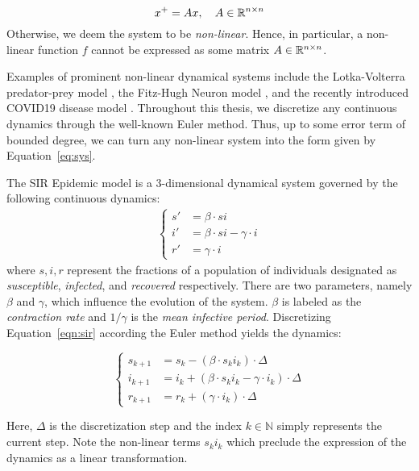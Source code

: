 $$
x^{+} = Ax, \quad A \in {\mathbb{R}}^{n \times n}
$$
%
Otherwise, we deem the system to be \emph{non-linear}.
%
Hence, in particular, a non-linear function $f$ cannot be expressed as some matrix $A \in {\mathbb{R}}^{n \times n}$.

Examples of prominent non-linear dynamical systems include the Lotka-Volterra predator-prey model \cite{wangersky1978lotka}, the Fitz-Hugh Neuron model \cite{fitzhugh1961impulses}, and the recently introduced COVID19 disease model \cite{indiansuper2020supermodel}. Throughout this thesis, we discretize any continuous dynamics through the well-known Euler method. Thus, up to some error term of bounded degree, we can turn any non-linear system into the form given by Equation~\ref{eq:sys}.
%
\begin{example}
\label{ex:sir}
The SIR Epidemic model is a 3-dimensional dynamical system governed by the following continuous dynamics:
\begin{align} \label{eqn:sir}
    \begin{cases}
        s' &= \beta \cdot s i \\
        i' &= \beta \cdot s i - \gamma \cdot i \\
        r' &= \gamma \cdot i
    \end{cases}
\end{align}
where $s,i,r$ represent the fractions of a population of individuals designated as \textit{susceptible}, \textit{infected}, and \textit{recovered} respectively. There are two parameters, namely $\beta$ and $\gamma$, which influence the evolution of the system. $\beta$ is labeled as the \emph{contraction rate} and $1/\gamma$ is the \emph{mean infective period}.
%
Discretizing Equation~\ref{eqn:sir} according the Euler method yields the dynamics:

\begin{center}
\label{fig:discrete_sir}
  \begin{equation*}
      \begin{cases}
          s_{k+1} &= s_k - (\beta \cdot s_k i_k)\cdot\Delta \\
          i_{k+1} &= i_k + (\beta \cdot s_k i_k - \gamma \cdot i_k)\cdot\Delta \\
          r_{k+1} &= r_k + (\gamma\cdot i_k)\cdot\Delta
      \end{cases}
  \end{equation*}
\end{center}
 Here, $\Delta$ is the discretization step and the index $k \in \mathbb{N}$ simply represents the current step.
%
Note the non-linear terms $s_ki_k$ which preclude the expression of the dynamics as a linear transformation.
\end{example}

